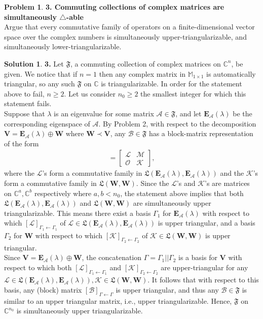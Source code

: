 \documentclass{article}
\theoremstyle{definition}
\newtheorem*{prob*}{Problem}
\newtheorem*{sln*}{Solution}
\newcommand{\V}{\mathbf{V}}
\newcommand{\W}{\mathbf{W}}
\newcommand{\A}{\mathcal{A}}
\newcommand{\B}{\mathcal{B}}
\newcommand{\lag}{\mathcal{L}}
\newcommand{\M}{\mathcal{M}}
\newcommand{\K}{\mathcal{K}}
\newcommand{\FF}{\mathfrak{F}}
\newcommand{\LL}{\mathfrak{L}}
\begin{document}
\newpage


\begin{prob*}\textbf{3. Commuting collections of complex matrices are simultaneously $\triangle$-able} \\
	Argue that every commutative family of operators on a finite-dimensional vector space over the complex numbers is simultaneously upper-triangularizable, and simultaneously lower-triangularizable. \\
	
	\begin{sln*}\textbf{3. }Let $\FF$, a commuting collection of complex matrices on $\mathbb{C}^n$, be given. We notice that if $n=1$ then any complex matrix in $\mathbb{M}_{1\times 1}$ is automatically triangular, so any such $\FF$ on $\mathbb{C}$ is triangularizable. In order for the statement above to fail, $n \geq 2$. Let us consider $n_0 \geq 2$ the smallest integer for which this statement fails. \\
		
	Suppose that $\lambda$ is an eigenvalue for some matrix $\A \in \FF$, and let $\textbf{E}_\A(\lambda)$ be the corresponding eigenspace of $\A$. By Problem 2, with respect to the decomposition $\V = \textbf{E}_\A(\lambda) \oplus \W$ where $\W \prec \V$, any $\B \in \FF$ has a block-matrix representation of the form 
	\begin{align*}
	[\B] = \begin{bmatrix}
	\lag & \M \\
	\mathcal{O} & \K
	\end{bmatrix},
	\end{align*} 
	where the $\lag$'s form a commutative family in $\LL(\textbf{E}_\A(\lambda),\textbf{E}_\A(\lambda))$ and the $\K$'s form a commutative family in $\LL(\W,\W)$. Since the $\lag$'s and $\K$'s are matrices on $\mathbb{C}^a, \mathbb{C}^b$ respectively where $a,b < n_0$, the statement above implies that both $\LL(\textbf{E}_\A(\lambda),\textbf{E}_\A(\lambda))$ and $\LL(\W,\W)$ are simultaneously upper triangularizable. This means there exist a basis $\Gamma_1$ for $\textbf{E}_\A(\lambda)$ with respect to which $[\lag]_{\Gamma_1\leftarrow\Gamma_1}$ of $\lag \in \LL(\textbf{E}_\A(\lambda),\textbf{E}_\A(\lambda))$ is upper triangular, and a basis $\Gamma_2$ for $\W$ with respect to which $[\K]_{\Gamma_2\leftarrow\Gamma_2}$ of $\K \in \LL(\W,\W)$ is upper triangular. \\
	
	Since $\V = \textbf{E}_\A(\lambda)\oplus \W$, the concatenation $\Gamma = \Gamma_1 || \Gamma_2$ is a basis for $\V$ with respect to which both $[\lag]_{\Gamma_1\leftarrow\Gamma_1}$ and $[\K]_{\Gamma_2\leftarrow\Gamma_2}$ are upper-triangular for any $\lag \in \LL(\textbf{E}_\A(\lambda),\textbf{E}_\A(\lambda)), \K\in \LL(\W,\W)$. It follows that with respect to this basis, any (block) matrix $[\B]_{\Gamma\leftarrow\Gamma}$ is upper triangular, and thus any $\B \in \FF$ is similar to an upper triangular matrix, i.e., upper triangularizable. Hence, $\FF$ on $\mathbb{C}^{n_0}$ is simultaneously upper triangularizable. \\
	

\end{sln*}
\end{prob*}
\end{document}
